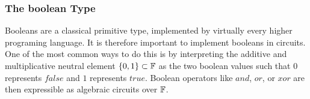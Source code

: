 \begin{comment}
To synthesize the associated circuit, we start with the twisted Edwards addition law XXX\sme{add reference} of the tiny-jubjub curve:
$$
(x,y) = \left(\frac{x_1y_2+y_1x_2}{1+8x_1y_1x_2y_2}, \frac{y_1y_2-3x_1x_2}{1-8x_1y_1x_2y_2} \right)
$$ 
To transform this expression into a circuit, we rewrite it in terms of the binary operators $ADD$, $SUB$, $MUL$, $DIV$ that represent the four fundamental field operations in $\F_{13}$. We get
\begin{align*}
(x,y) & = (\\
  & \scriptstyle DIV(ADD(MUL(x_1,y_2),MUL(y_1,x_2)),
         ADD(1,MUL(8,MUL(MUL(x_1,y_1),MUL(x_2,y_2))))), \\   
  & \scriptstyle DIV(ADD(MUL(y_1,y_2),MUL(MUL(3,x_1),x_2)),
         ADD(1,MUL(8,MUL(MUL(x_1,y_1),MUL(x_2,y_2)))))\\
  & )
\end{align*}
We then proceed inductively choosing circuits for the outer most operators, which in this case are two division circuits. We don't expand their inputs into circuits yet, but only represent the inputs symbolically. For better readability we use the symbols of the next operator only, because otherwise the circuit becomes unreadable. We get:
\begin{center}
\digraph[scale=0.4]{TEA}{
	forcelabels=true;
	center=true;
	splines=ortho;
	nodesep= 2.0;
	// x-value
	nx1 -> nx6 [xlabel="Ex_1  "];
	nx2 -> nx4 [xlabel="Ex_2  "];
	nx3 -> nx6 [xlabel="Ex_3  "];
	nx3 -> nx4 [xlabel="Ex_3  "];
	nx4 -> nx5 [xlabel="Ex_4  "];
	nx6 -> nx7 [xlabel="Ex_5  "];
	nx1 [shape=box, label="ADD(.,.)"];
	nx2 [shape=box, label="ADD(.,.)"];
	nx3 [shape=box, label="ADD(.,.)_INV"];
	nx4 [label="*"];	
	nx5 [shape=box, label="1"];
	nx6 [label="*"];	
	nx7 [shape=box, label="DIV(ADD(.,.),ADD(.,.))"];
	// y-value
	ny1 -> ny6 [xlabel="Ey_1  "];
	ny2 -> ny4 [xlabel="Ey_2  "];
	ny3 -> ny6 [xlabel="Ey_3  "];
	ny3 -> ny4 [xlabel="Ey_3  "];
	ny4 -> ny5 [xlabel="Ey_4  "];
	ny6 -> ny7 [xlabel="Ey_5  "];
	ny1 [shape=box, label="ADD(.,.)"];
	ny2 [shape=box, label="ADD(.,.)"];
	ny3 [shape=box, label="ADD(.,.)_INV"];
	ny4 [label="*"];	
	ny5 [shape=box, label="1"];
	ny6 [label="*"];	
	ny7 [shape=box, label="DIV(ADD(.,.),ADD(.,.))"];	
}
\end{center}

\end{example}
\end{comment}

\subsubsection{The boolean Type} 
Booleans are a classical primitive type, implemented by virtually every higher programing language. It is therefore important to implement booleans in circuits. One of the most common ways to do this is by interpreting the additive and multiplicative neutral element $\{0,1\}\subset \mathbb{F}$ as the two boolean values such that $0$ represents $false$ and $1$ represents $true$. Boolean operators like $and$, $or$, or $xor$ are then expressible as algebraic circuits over $\mathbb{F}$. 

